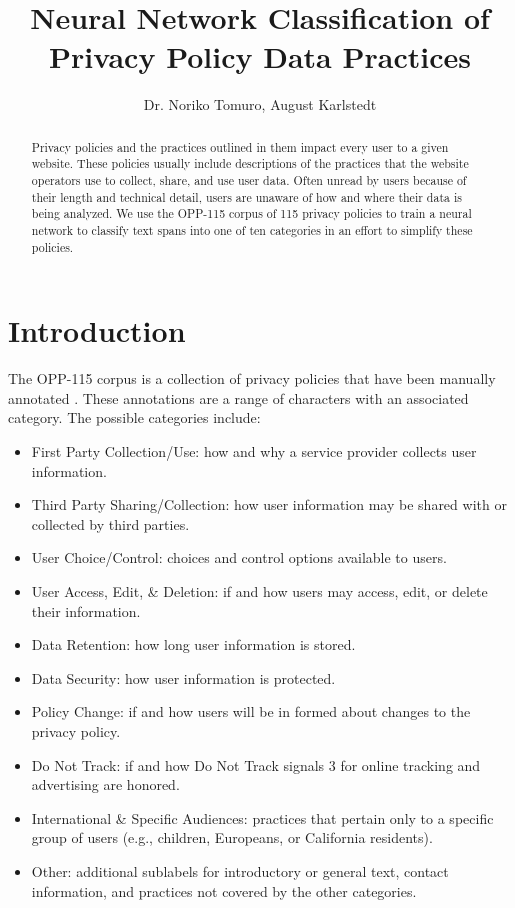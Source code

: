 \documentclass[12pt, letterpaper]{article}
\title{Neural Network Classification of Privacy Policy Data Practices}
\author{Dr. Noriko Tomuro, August Karlstedt}
\begin{document}
\maketitle

\begin{abstract}
Privacy policies and the practices outlined in them impact every user to a given website. These policies usually include descriptions of the practices that the website operators use to collect, share, and use user data. Often unread by users because of their length and technical detail, users are unaware of how and where their data is being analyzed. We use the OPP-115 corpus of 115 privacy policies to train a neural network to classify text spans into one of ten categories in an effort to simplify these policies.
\end{abstract}

\section{Introduction}
The OPP-115 corpus is a collection of privacy policies that have been manually annotated \cite{wilson2016creation}. These annotations are a range of characters with an associated category. The possible categories include:

\begin{itemize}
\item First Party Collection/Use: how and why a service provider collects user information.
\item Third Party Sharing/Collection: how user information may be shared with or collected by third parties.
\item User Choice/Control: choices and control options available to users.
\item User Access, Edit, \& Deletion: if and how users may access, edit, or delete their information.
\item Data Retention: how long user information is stored.
\item Data Security: how user information is protected.
\item Policy Change: if and how users will be in formed about changes to the privacy policy.
\item Do Not Track: if and how Do Not Track signals 3 for online tracking and advertising are honored.
\item International \& Specific Audiences: practices that pertain only to a specific group of users (e.g., children, Europeans, or California residents).
\item Other: additional sublabels for introductory or general text, contact information, and practices not covered by the other categories.
\end{itemize}
\end{document}

